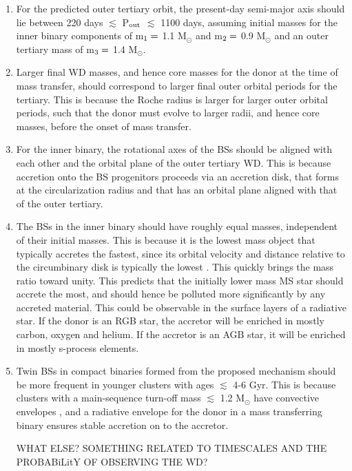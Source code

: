 \documentclass{aastex62}
\begin{document}
\begin{enumerate}

\item For the predicted outer tertiary orbit, the present-day semi-major axis should lie between 220 days $\lesssim$ P$_{\rm out}$ $\lesssim$ 1100 days, assuming initial masses for the inner binary components of m$_{\rm 1} =$ 1.1 M$_{\odot}$ and m$_{\rm 2} =$ 0.9 M$_{\odot}$ and an outer tertiary mass of m$_{\rm 3} =$ 1.4 M$_{\odot}$.

\item Larger final WD masses, and hence core masses for the donor at the time of mass transfer, should correspond to larger final outer orbital periods for the tertiary.  This is because the Roche radius is larger for larger outer orbital periods, such that the donor must evolve to larger radii, and hence core masses, before the onset of mass transfer.

\item For the inner binary, the rotational axes of the BSs should be aligned with each other and the orbital plane of the outer tertiary WD.  This is because accretion onto the BS progenitors proceeds via an accretion disk, that forms at the circularization radius and that has an orbital plane aligned with that of the outer tertiary.

\item The BSs in the inner binary should have roughly equal masses, independent of their initial masses.  This is because it is the lowest mass object that typically accretes the fastest, since its orbital velocity and distance relative to the circumbinary disk is typically the lowest \citep[e.g.][]{haiman09,farris15,rafikov16,kelley17}.  This quickly brings the mass ratio toward unity.  This predicts that the initially lower mass MS star should accrete the most, and should hence be polluted more significantly by any accreted material.  This could be observable in the surface layers of a radiative star.  If the donor is an RGB star, the accretor will be enriched in mostly carbon, oxygen and helium.  If the accretor is an AGB star, it will be enriched in mostly s-process elements.

\item Twin BSs in compact binaries formed from the proposed mechanism should be more frequent in younger clusters with ages $\lesssim$ 4-6 Gyr.  This is because clusters with a main-sequence turn-off mass $\lesssim$ 1.2 M$_{\odot}$ have convective envelopes \citep[e.g.][]{iben91,maedoer09}, and a radiative envelope for the donor in a mass transferring binary ensures stable accretion on to the accretor.

WHAT ELSE?  SOMETHING RELATED TO TIMESCALES AND THE PROBABiLitY OF OBSERVING THE WD?

\end{enumerate}
\end{document}
